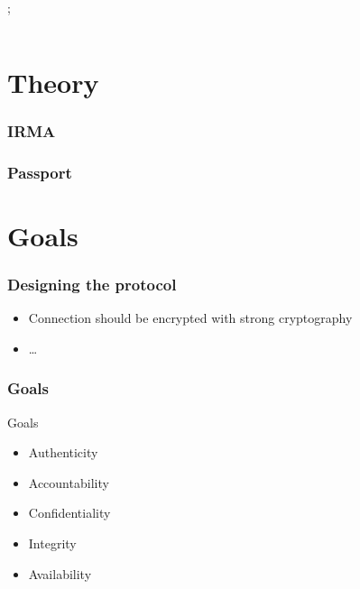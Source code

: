 \documentclass[hyperref={urlcolor=black, citecolor=black, pdfpagemode=UseNone, pdfpagelayout=SinglePage, pdfstartview=}]{beamer}
\begin{document}
\begin{frame}
\begin{columns}
    ;
  \end{columns}
\end{frame}

\section{Theory}
\begin{frame}
  \frametitle{IRMA}
\end{frame}

\begin{frame}
  \frametitle{Passport}
\end{frame}

\section{Goals}
\begin{frame}
  \frametitle{Designing the protocol}
  \begin{itemize}
    \item Connection should be encrypted with strong cryptography
    \item \ldots
  \end{itemize}
\end{frame}

\begin{frame}
  \frametitle{Goals}
  \begin{block}{Goals}
    \begin{itemize}
      \item Authenticity
      \item Accountability
      \item Confidentiality
      \item Integrity
      \item \scriptsize Availability
    \end{itemize}
  \end{block}
\end{frame}
\end{document}

